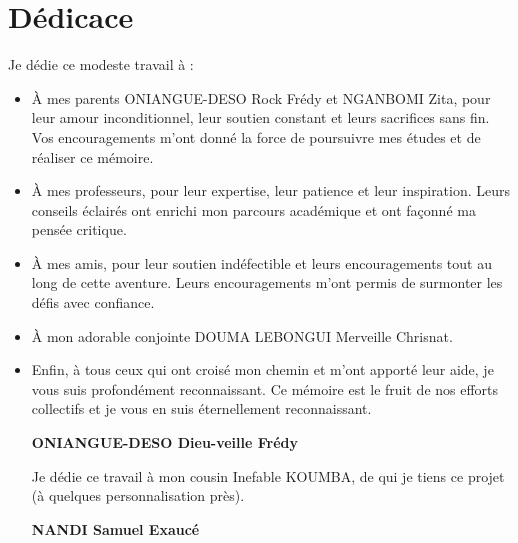 \chapter*{Dédicace}
Je dédie ce modeste travail à :
\begin{itemize}
  \item {
    À mes parents ONIANGUE-DESO Rock Frédy et NGANBOMI Zita, pour leur amour
    inconditionnel, leur soutien constant et leurs sacrifices sans fin. Vos
    encouragements m’ont donné la force de poursuivre mes études et de réaliser ce mémoire.
  }
\item {
    À mes professeurs, pour leur expertise, leur patience et leur inspiration.
    Leurs conseils éclairés ont enrichi mon parcours académique et ont façonné ma pensée critique.

  }
\item {
    À mes amis, pour leur soutien indéfectible et leurs encouragements tout au
    long de cette aventure. Leurs encouragements m’ont permis de surmonter les défis avec confiance.

  }

\item {
    À mon adorable conjointe DOUMA LEBONGUI Merveille Chrisnat.

  }

  \item {
    Enfin, à tous ceux qui ont croisé mon chemin et m’ont apporté leur aide, je vous suis profondément reconnaissant. Ce mémoire est le fruit de nos efforts collectifs et je vous en suis éternellement reconnaissant.
  }

  \vspace{0.2cm}
  \begin{flushright}
    \large {
      \textbf {
        ONIANGUE-DESO Dieu-veille Frédy
      }
    }
  \end{flushright}

  \vspace{1.5cm}

  Je dédie ce travail à mon cousin  Inefable KOUMBA, de qui je tiens ce 	projet (à quelques personnalisation près).
  \vspace{0.2cm}
  \begin{flushright}
    \large {
      \textbf {
        NANDI Samuel Exaucé
    }
    }
  \end{flushright}

\end{itemize}

